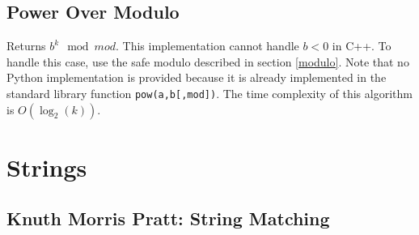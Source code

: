 \documentclass[letterpaper,11pt,twoside]{article}
\begin{document}
            \subsection{Power Over Modulo} \label{power}
                Returns $b^{k} \mod mod$.
                This implementation cannot handle $b < 0$ in C++.
                To handle this case, use the safe modulo described in section \ref{modulo}.
                Note that no Python implementation is provided because it is already implemented in the standard library function \verb|pow(a,b[,mod])|.
                The time complexity of this algorithm is $O(\log_{2}(k))$.
                
        \section{Strings}
            \subsection{Knuth Morris Pratt: String Matching} \label{kmp}
\end{document}
